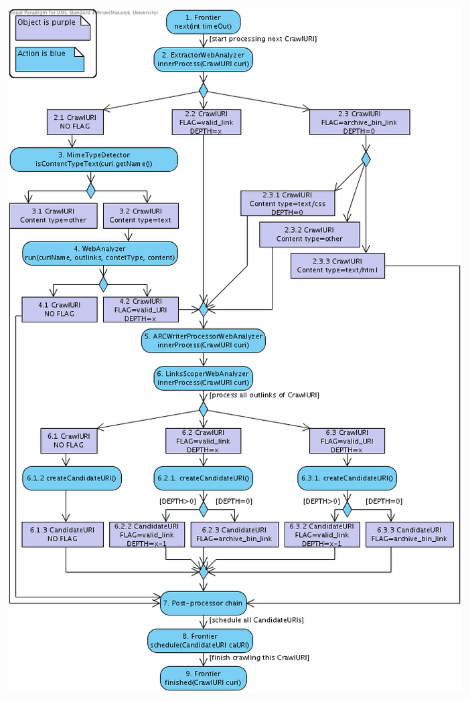 \documentclass[11pt,a4paper]{article}
\begin{document}
\includegraphics[width=120mm]{archiveLinks.png}
\end{document}
